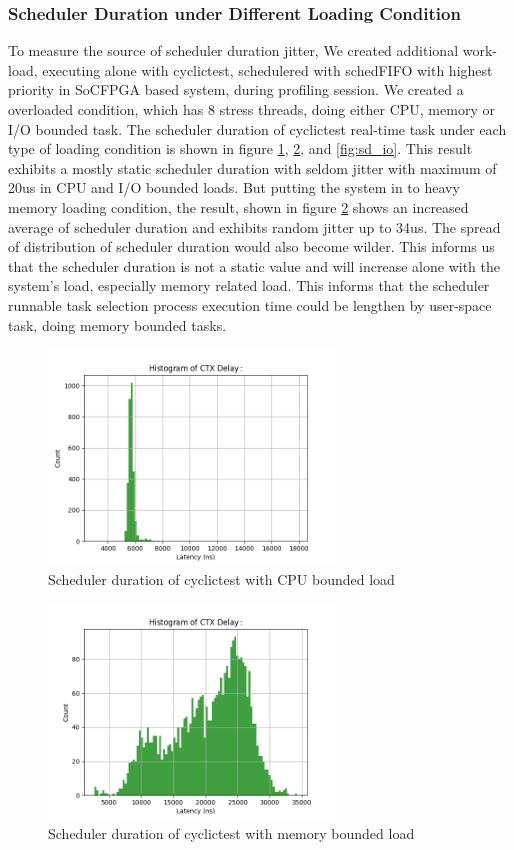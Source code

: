 \documentclass[conference]{IEEEtran}
\begin{document}
\subsubsection{Scheduler Duration under Different Loading Condition}

    To measure the source of scheduler duration jitter, We created additional work-load, executing alone with
    cyclictest, schedulered with schedFIFO with highest priority in SoCFPGA based system, during profiling session. We
    created a overloaded condition, which has 8 stress threads, doing either CPU, memory or I/O bounded task. The
    scheduler duration of cyclictest real-time task under each type of loading condition is shown in figure
    \ref{fig:sd_cpu}, \ref{fig:sd_memory}, and \ref{fig:sd_io}. This result exhibits a mostly static scheduler
    duration with seldom jitter with maximum of 20us in CPU and I/O bounded loads. But putting the system in to heavy
    memory loading condition, the result, shown in figure \ref{fig:sd_memory} shows an increased average of scheduler
    duration and exhibits random jitter up to 34us. The spread of distribution of scheduler duration would also become
    wilder. This informs us that the scheduler duration is not a static value and will increase alone with the system's
    load, especially memory related load. This informs that the scheduler runnable task selection process execution time
    could be lengthen by user-space task, doing memory bounded tasks.

    \begin{figure} \centering \includegraphics[width=3in]{img/sd-cpu.png} \caption{Scheduler duration of cyclictest
    with CPU bounded load} \label{fig:sd_cpu} \end{figure}

    \begin{figure} \centering \includegraphics[width=3in]{img/sd-memory.png} \caption{Scheduler duration of cyclictest
    with memory bounded load} \label{fig:sd_memory} \end{figure}
\end{document}
